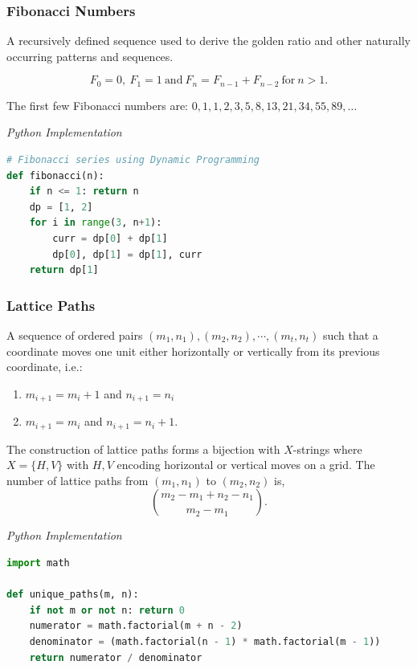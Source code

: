 \documentclass{article}
\begin{document}
    \subsubsection{Fibonacci Numbers}
    A recursively defined sequence used to derive the golden ratio and other naturally occurring patterns and sequences.
    
    \[
         F_{0}=0, \ F_{1}=1 \ \text{and} \ 
        F_{n}=F_{n-1}+F_{n-2} \ \text{for}  \ n > 1.
    \]
    
    The first few Fibonacci numbers are: $0, 1, 1, 2, 3, 5, 8, 13, 21, 34, 55, 89, \dots$
    
\vspace{8pt} \emph{Python Implementation}
\begin{lstlisting}[language=Python]
# Fibonacci series using Dynamic Programming  
def fibonacci(n):
    if n <= 1: return n
    dp = [1, 2]
    for i in range(3, n+1):
        curr = dp[0] + dp[1]
        dp[0], dp[1] = dp[1], curr
    return dp[1]
\end{lstlisting}

    \subsubsection{Lattice Paths}

    A sequence of ordered pairs $(m_1, n_1), (m_2, n_2), \cdots, (m_t, n_t)$ such that a coordinate moves one unit either horizontally or vertically from its previous coordinate, i.e.:
    \begin{enumerate}
        \item $m_{i+1} = m_{i}+1$ and $n_{i+1} = n_{i}$
        \item $m_{i+1} = m_i$ and $n_{i+1} = n_i +1$.
    \end{enumerate}
    The construction of lattice paths forms a bijection with $X$-strings where $X = \{ H, V\}$ with $H,V$ encoding horizontal or vertical moves on a grid. The number of lattice paths from $(m_1, n_1)$ to $(m_2,n_2)$ is,
    \[
       \binom{m_2 - m_1 + n_2 - n_1}{m_2-m_1}.
    \]

\vspace{8pt} \emph{Python Implementation}
\begin{lstlisting}[language=Python]
import math

def unique_paths(m, n):
    if not m or not n: return 0
    numerator = math.factorial(m + n - 2)
    denominator = (math.factorial(n - 1) * math.factorial(m - 1))
    return numerator / denominator
\end{lstlisting}
\end{document}

